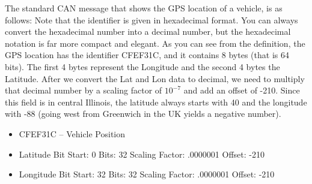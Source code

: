 \documentclass[12pt,letterpaper]{article}
\begin{document}
The standard CAN message that shows the GPS location of a vehicle, is as follows: Note that the identifier is given in hexadecimal format. You can always convert the hexadecimal number into a decimal number, but the hexadecimal notation is far more compact and elegant. As you can see from the definition, the GPS location has the identifier CFEF31C, and it contains 8 bytes (that is 64 bits). The first 4 bytes represent the Longitude and the second 4 bytes the Latitude. After we convert the Lat and Lon data to decimal, we need to multiply that decimal number by a scaling factor of $10^{-7}$ and add an offset of -210. Since this field is in central Illinois, the latitude always starts with 40 and the longitude with -88 (going west from Greenwich in the UK yields a negative number).

\begin{itemize}
	\item   CFEF31C – Vehicle Position
	\item	Latitude
	\subitem	Bit Start: 0
	\subitem	Bits: 32
	\subitem	Scaling Factor: .0000001
	\subitem	Offset: -210
	\item	Longitude
	\subitem	Bit Start: 32
	\subitem	Bits: 32
	\subitem	Scaling Factor: .0000001
	\subitem	Offset: -210
\end{itemize}
\end{document}
